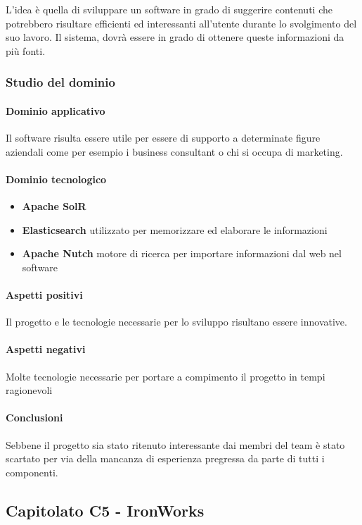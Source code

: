     L'idea è quella di sviluppare un software in grado di suggerire contenuti che potrebbero risultare efficienti ed interessanti all'utente durante lo svolgimento del suo lavoro. Il sistema, dovrà essere in grado di ottenere queste informazioni da più fonti.
	
	\subsubsection{Studio del dominio} 
	\paragraph{Dominio applicativo} \Spazio
	Il software risulta essere utile per essere di supporto a determinate figure aziendali come per esempio i business consultant o chi si occupa di marketing.
	\paragraph{Dominio tecnologico}
		\begin{itemize}
		\item \textbf{Apache SolR} 
		\item \textbf{Elasticsearch} utilizzato per memorizzare ed elaborare le informazioni
		\item \textbf{Apache Nutch} motore di ricerca per importare informazioni dal web nel software
	\end{itemize}
	
	\paragraph{Aspetti positivi} \Spazio
	Il progetto e le tecnologie necessarie per lo sviluppo risultano essere innovative.
	\paragraph{Aspetti negativi} \Spazio
     Molte tecnologie necessarie per portare a compimento il progetto in tempi ragionevoli
	

	\paragraph{Conclusioni} \Spazio
	Sebbene il progetto sia stato ritenuto interessante dai membri del team è stato scartato per via della mancanza di esperienza pregressa da parte di tutti i componenti.
	
	\subsection{Capitolato C5 - IronWorks}
